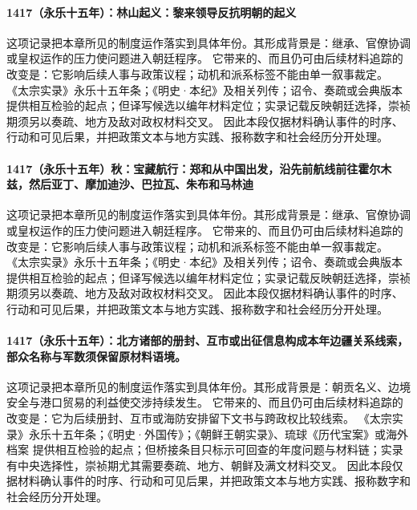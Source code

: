 \paragraph{1417（永乐十五年）：林山起义：黎来领导反抗明朝的起义} 这项记录把本章所见的制度运作落实到具体年份。其形成背景是：继承、官僚协调或皇权运作的压力使问题进入朝廷程序。 它带来的、而且仍可由后续材料追踪的改变是：它影响后续人事与政策议程；动机和派系标签不能由单一叙事裁定。 《太宗实录》永乐十五年条；《明史·本纪》及相关列传；诏令、奏疏或会典版本 提供相互检验的起点；但译写候选以编年材料定位；实录记载反映朝廷选择，崇祯期须另以奏疏、地方及敌对政权材料交叉。 因此本段仅据材料确认事件的时序、行动和可见后果，并把政策文本与地方实践、报称数字和社会经历分开处理。

\paragraph{1417（永乐十五年）秋：宝藏航行：郑和从中国出发，沿先前航线前往霍尔木兹，然后亚丁、摩加迪沙、巴拉瓦、朱布和马林迪} 这项记录把本章所见的制度运作落实到具体年份。其形成背景是：继承、官僚协调或皇权运作的压力使问题进入朝廷程序。 它带来的、而且仍可由后续材料追踪的改变是：它影响后续人事与政策议程；动机和派系标签不能由单一叙事裁定。 《太宗实录》永乐十五年条；《明史·本纪》及相关列传；诏令、奏疏或会典版本 提供相互检验的起点；但译写候选以编年材料定位；实录记载反映朝廷选择，崇祯期须另以奏疏、地方及敌对政权材料交叉。 因此本段仅据材料确认事件的时序、行动和可见后果，并把政策文本与地方实践、报称数字和社会经历分开处理。

\paragraph{1417（永乐十五年）：北方诸部的册封、互市或出征信息构成本年边疆关系线索，部众名称与军数须保留原材料语境。} 这项记录把本章所见的制度运作落实到具体年份。其形成背景是：朝贡名义、边境安全与港口贸易的利益使交涉持续发生。 它带来的、而且仍可由后续材料追踪的改变是：它为后续册封、互市或海防安排留下文书与跨政权比较线索。 《太宗实录》永乐十五年条；《明史·外国传》；《朝鲜王朝实录》、琉球《历代宝案》或海外档案 提供相互检验的起点；但桥接条目只标示可回查的年度问题与材料链；实录有中央选择性，崇祯期尤其需要奏疏、地方、朝鲜及满文材料交叉。 因此本段仅据材料确认事件的时序、行动和可见后果，并把政策文本与地方实践、报称数字和社会经历分开处理。

